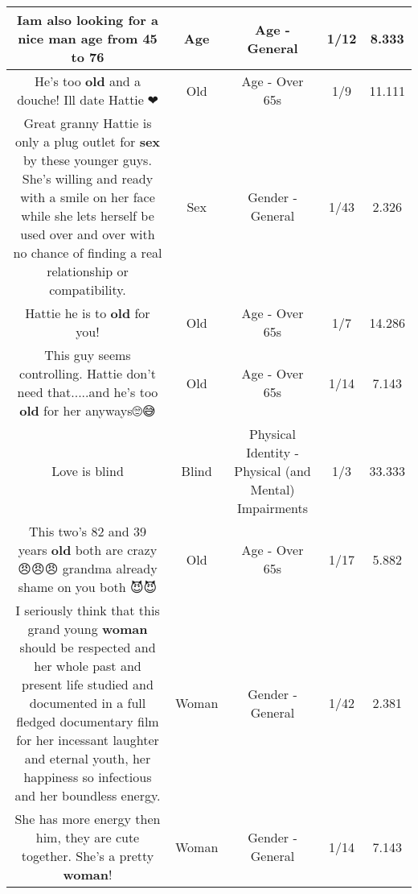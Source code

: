 \documentclass[11pt]{article}
\newlength\mylength
\begin{document}
\begin{center}
\begin{longtable}{|C{.65\mylength}|C{.30\mylength}|C{.12\mylength}|C{.12\mylength}|C{.12\mylength}|}
  \small Iam also looking for a nice man  \textbf{age} from 45 to 76\normalsize   & Age & Age - General & 1/12 & 8.333 \\  \hline
  \small He's too \textbf{old} and a douche! Ill date Hattie🤣❤\normalsize   & Old & Age - Over 65s & 1/9 & 11.111 \\  \hline
  \small Great granny Hattie is only a plug outlet for \textbf{sex} by these younger guys. She's willing and ready with a smile on her face while she lets herself be used over and over with no chance of finding a real relationship or compatibility.\normalsize   & Sex & Gender - General & 1/43 & 2.326 \\  \hline
  \small Hattie he is to \textbf{old} for you!\normalsize   & Old & Age - Over 65s & 1/7 & 14.286 \\  \hline
  \small This guy seems controlling. Hattie don't need that.....and he's too \textbf{old} for her anyways🙄😅\normalsize   & Old & Age - Over 65s & 1/14 & 7.143 \\  \hline
  \small Love is blind\normalsize   & Blind & Physical Identity - Physical (and Mental) Impairments & 1/3 & 33.333 \\  \hline
  \small This two's 82 and 39 years \textbf{old} both are crazy😠😠😠 grandma   already shame on you both 😈😈\normalsize   & Old & Age - Over 65s & 1/17 & 5.882 \\  \hline
  \small I seriously think that this grand young  \textbf{woman} should be respected and her whole past and present life studied and documented in a full fledged documentary film for her incessant  laughter and eternal youth, her happiness so infectious and her boundless energy.\normalsize   & Woman & Gender - General & 1/42 & 2.381 \\  \hline
  \small She has more energy then him, they are cute together. She's a pretty \textbf{woman}!\normalsize   & Woman & Gender - General & 1/14 & 7.143 \\  \hline

\end{longtable}
\end{center}
\end{document}
